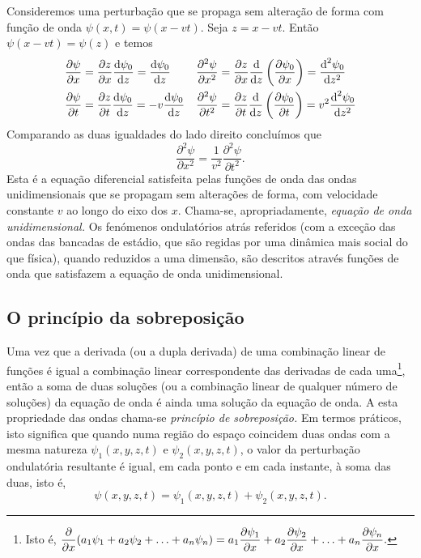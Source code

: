 Consideremos uma perturbação que se propaga sem alteração de forma com função de
onda $\psi(x,t)=\psi(x-vt)$. Seja $z=x-vt$. Então $\psi(x-vt)=\psi(z)$ e temos
\begin{align*}
    \frac{\partial \psi}{\partial x}&=\frac{\partial z}{\partial x}\frac{\text{d} \psi_0}{\text{d} z}=\frac{\text{d} \psi_0}{\text{d} z}&
    \frac{\partial^2\psi}{\partial x^2}&=\frac{\partial z}{\partial x}\frac{\text{d} }{\text{d} z}\left(\frac{\partial \psi_0}{\partial x}
        \right)=\frac{\text{d}^2\psi_0}{\text{d}z^2}\\
    \frac{\partial \psi}{\partial t}&=\frac{\partial z}{\partial t}\frac{\text{d} \psi_0}{\text{d} z}=-v\frac{\text{d} \psi_0}{\text{d} z}&
    \frac{\partial^2\psi}{\partial t^2}&=\frac{\partial z}{\partial t}\frac{\text{d} }{\text{d} z}\left(\frac{\partial \psi_0}{\partial t}
        \right)=v^2\frac{\text{d}^2\psi_0}{\text{d}z^2}
\end{align*}
Comparando as duas igualdades do lado direito concluímos que
\begin{equation}\label{eq:waveq}
    \frac{\partial^2\psi}{\partial x^2} =
        \frac{1}{v^2} \frac{\partial^2\psi}{\partial t^2}.
\end{equation}
Esta é a equação diferencial satisfeita pelas funções de onda das ondas
unidimensionais que se propagam sem alterações de forma, com velocidade
constante $v$ ao longo do eixo dos $x$. Chama-se, apropriadamente, \emph{equação
de onda unidimensional.} Os fenómenos ondulatórios atrás referidos (com a
exceção das ondas das bancadas de estádio, que são regidas por uma dinâmica mais
social do que física), quando reduzidos a uma dimensão, são descritos através
funções de onda que satisfazem a equação de onda unidimensional.



\subsection{O princípio da sobreposição}
Uma vez que a derivada (ou a dupla derivada) de uma combinação linear de funções
é igual a combinação linear correspondente das derivadas de cada
uma\footnote{Isto é,
    $\displaystyle\frac{\partial }{\partial x}(a_1\psi_1+a_2\psi_2+\ldots+a_n\psi_n)=
a_1\frac{\partial \psi_1}{\partial x}+a_2\frac{\partial \psi_2}{\partial x}+\ldots+a_n\frac{\partial \psi_n}{\partial x}.$}, então a soma
de duas soluções (ou a combinação linear de qualquer número de soluções) da
equação de onda é ainda uma solução da equação de onda. A esta propriedade das
ondas chama-se \emph{princípio de sobreposição.} Em termos práticos, isto
significa que quando numa região do espaço coincidem duas ondas com a mesma
natureza $\psi_1(x,y,z,t)$ e $\psi_2(x,y,z,t)$, o valor da perturbação
ondulatória resultante é igual, em cada ponto e em cada instante, à soma das
duas, isto é,
\begin{equation*}
\psi(x,y,z,t)=\psi_1(x,y,z,t)+\psi_2(x,y,z,t).
\end{equation*}

